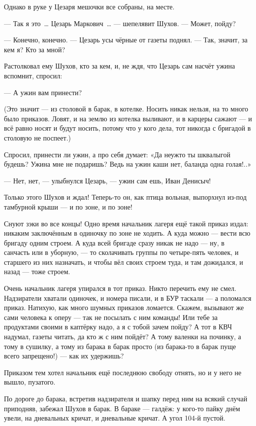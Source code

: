 Однако в руке у Цезаря мешочки все собраны, на месте.

--- Так я это~\dots{} Цезарь Маркович~\dots{} --- шепелявит Шухов. --- Может, пойду?

--- Конечно, конечно. --- Цезарь усы чёрные от газеты поднял. --- Так, значит, за кем я? Кто за мной?

Растолковал ему Шухов, кто за кем, и, не ждя, что Цезарь сам насчёт ужина вспомнит, спросил:

--- А ужин вам принести?

(Это значит --- из столовой в барак, в котелке. Носить никак нельзя, на то много было приказов. Ловят, и на землю из котелка выливают, и в карцеры сажают --- и всё равно носят и будут носить, потому что у кого дела, тот никогда с бригадой в столовую не поспеет.)

Спросил, принести ли ужин, а про себя думает: «Да неужто ты шквалыгой будешь? Ужина мне не подаришь? Ведь на ужин каши нет, баланда одна голая!..»

--- Нет, нет, --- улыбнулся Цезарь, --- ужин сам ешь, Иван Денисыч!

Только этого Шухов и ждал! Теперь-то он, как птица вольная, выпорхнул из-под тамбурной крыши --- и по зоне, и по зоне!

Снуют зэки во все концы! Одно время начальник лагеря ещё такой приказ издал: никаким заключённым в одиночку по зоне не ходить. А куда можно --- вести всю бригаду одним строем. А куда всей бригаде сразу никак не надо --- ну, в санчасть или в уборную, --- то сколачивать группы по четыре-пять человек, и старшего из них назначать, и чтобы вёл своих строем туда, и там дожидался, и назад --- тоже строем.

Очень начальник лагеря упирался в тот приказ. Никто перечить ему не смел. Надзиратели хватали одиночек, и номера писали, и в БУР таскали --- а поломался приказ. Натихую, как много шумных приказов ломается. Скажем, вызывают же сами человека к оперу --- так не посылать с ним команды! Или тебе за продуктами своими в каптёрку надо, а я с тобой зачем пойду? А тот в КВЧ надумал, газеты читать, да кто ж с ним пойдёт? А тому валенки на починку, а тому в сушилку, а тому из барака в барак просто (из барака-то в барак пуще всего запрещено!) --- как их удержишь?

Приказом тем хотел начальник ещё последнюю свободу отнять, но и у него не вышло, пузатого.

По дороге до барака, встретив надзирателя и шапку перед ним на всякий случай приподняв, забежал Шухов в барак. В бараке --- галдёж: у кого-то пайку днём увели, на дневальных кричат, и дневальные кричат. А угол 104-й пустой.

